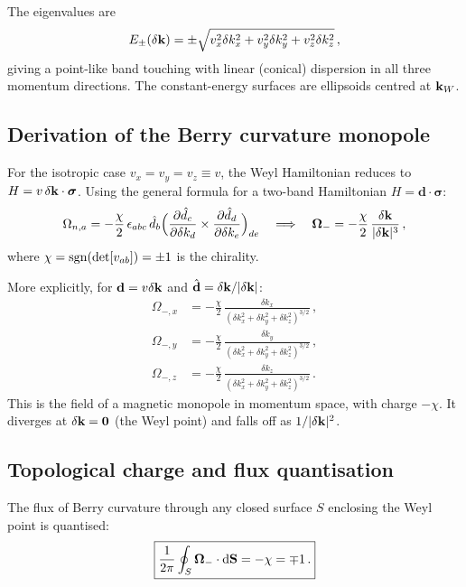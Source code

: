 The eigenvalues are
\begin{equation}\label{eq:ch15-weyl-dispersion}
  E_\pm(\delta\mathbf{k}) = \pm\sqrt{v_x^2\delta k_x^2
  +v_y^2\delta k_y^2+v_z^2\delta k_z^2}\,,
\end{equation}
giving a point-like band touching with linear (conical) dispersion in
all three momentum directions.  The constant-energy surfaces are
ellipsoids centred at $\mathbf{k}_W$.

\subsection{Derivation of the Berry curvature monopole}
\label{sec:ch15-monopole-derivation}

For the isotropic case $v_x=v_y=v_z\equiv v$, the Weyl Hamiltonian
reduces to $H=v\,\delta\mathbf{k}\cdot\boldsymbol{\sigma}$.  Using the
general formula for a two-band Hamiltonian $H=\mathbf{d}\cdot
\boldsymbol{\sigma}$:
\begin{equation}\label{eq:ch15-general-berry}
  \Omega_{n,a}
  = -\frac{\chi}{2}\,\epsilon_{abc}\,
  \hat{d}_b\Bigl(\frac{\partial \hat{d}_c}{\partial \delta k_d}\times
  \frac{\partial \hat{d}_d}{\partial \delta k_e}\Bigr)_{de}
  \quad\Longrightarrow\quad
  \boldsymbol{\Omega}_-
  = -\frac{\chi}{2}\,\frac{\delta\mathbf{k}}{|\delta\mathbf{k}|^3}\,,
\end{equation}
where $\chi=\operatorname{sgn}(\det[v_{ab}])=\pm 1$ is the chirality.

More explicitly, for $\mathbf{d}=v\delta\mathbf{k}$ and
$\hat{\mathbf{d}}=\delta\mathbf{k}/|\delta\mathbf{k}|$:
\begin{align}
  \Omega_{-,x} &= -\frac{\chi}{2}\,
    \frac{\delta k_x}{(\delta k_x^2+\delta k_y^2+\delta k_z^2)^{3/2}}\,,\\
  \Omega_{-,y} &= -\frac{\chi}{2}\,
    \frac{\delta k_y}{(\delta k_x^2+\delta k_y^2+\delta k_z^2)^{3/2}}\,,\\
  \Omega_{-,z} &= -\frac{\chi}{2}\,
    \frac{\delta k_z}{(\delta k_x^2+\delta k_y^2+\delta k_z^2)^{3/2}}\,.
\end{align}
This is the field of a magnetic monopole in momentum space, with charge
$-\chi$.  It diverges at $\delta\mathbf{k}=\mathbf{0}$ (the Weyl point)
and falls off as $1/|\delta\mathbf{k}|^2$.

\subsection{Topological charge and flux quantisation}
\label{sec:ch15-charge}

The flux of Berry curvature through any closed surface $S$ enclosing
the Weyl point is quantised:
\begin{equation}\label{eq:ch15-monopole-flux}
  \boxed{%
  \frac{1}{2\pi}\oint_S\boldsymbol{\Omega}_-\cdot\dd\mathbf{S}
  = -\chi = \mp 1\,.}
\end{equation}


